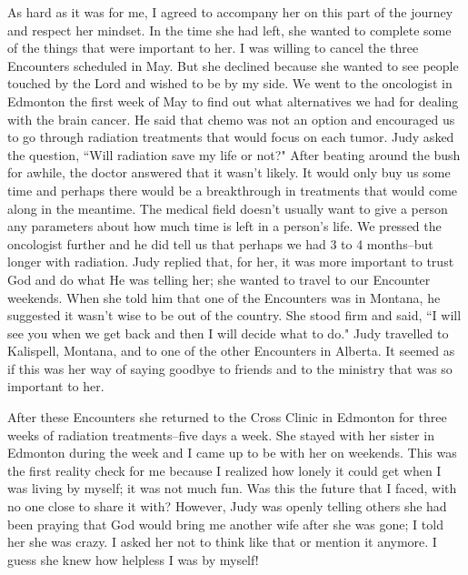 \documentclass[oneside]{book}
\begin{document}
As hard as it was for me, I agreed to accompany her on this part of the journey and respect her mindset. In the time she had left, she wanted to complete some of the things that were important to her. I was willing to cancel the three Encounters scheduled in May. But she declined because she wanted to see people touched by the Lord and wished to be by my side. We went to the oncologist in Edmonton the first week of May to find out what alternatives we had for dealing with the brain cancer. He said that chemo was not an option and encouraged us to go through radiation treatments that would focus on each tumor. Judy asked the question, ``Will radiation save my life or not?" After beating around the bush for awhile, the doctor answered that it wasn't likely. It would only buy us some time and perhaps there would be a breakthrough in treatments that would come along in the meantime. The medical field doesn't usually want to give a person any parameters about how much time is left in a person's life. We pressed the oncologist further and he did tell us that perhaps we had 3 to 4 months--but longer with radiation. Judy replied that, for her, it was more important to trust God and do what He was telling her; she wanted to travel to our Encounter weekends. When she told him that one of the Encounters was in Montana, he suggested it wasn't wise to be out of the country. She stood firm and said, ``I will see you when we get back and then I will decide what to do." Judy travelled to Kalispell, Montana, and to one of the other Encounters in Alberta. It seemed as if this was her way of saying goodbye to friends and to the ministry that was so important to her. 

After these Encounters she returned to the Cross Clinic in Edmonton for three weeks of radiation treatments--five days a week. She stayed with her sister in Edmonton during the week and I came up to be with her on weekends. This was the first reality check for me because I realized how lonely it could get when I was living by myself; it was not much fun. Was this the future that I faced, with no one close to share it with? However, Judy was openly telling others she had been praying that God would bring me another wife after she was gone; I told her she was crazy. I asked her not to think like that or mention it anymore. I guess she knew how helpless I was by myself!
\end{document}
